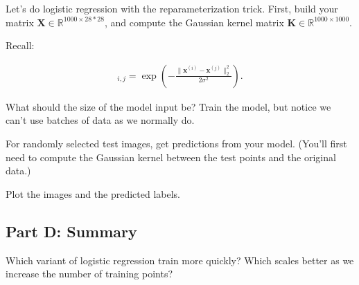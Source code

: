 \documentclass{article}
\begin{document}
Let's do logistic regression with the reparameterization trick.
First, build your matrix $\mathbf{X} \in \mathbb{R}^{1000 \times 28*28}$, and compute the Gaussian kernel matrix $\mathbf{K} \in \mathbb{R}^{1000 \times 1000}$.

Recall:

\begin{align}
    [\mathbf{K}]_{i,j} = \exp 
    \left(
    -\frac{\| \mathbf{x}^{(i)} - \mathbf{x}^{(j)}\|_2^2}{2\sigma^2}
    \right).
\end{align}

What should the size of the model input be?
Train the model, but notice we can't use batches of data as we normally do.

For randomly selected test images, get predictions from your model.
(You'll first need to compute the Gaussian kernel between the test points and the original data.)

Plot the images and the predicted labels.

\subsection*{Part D: Summary}

Which variant of logistic regression train more quickly?
Which scales better as we increase the number of training points?

%
\end{document}
